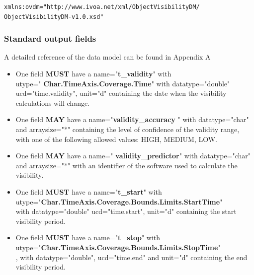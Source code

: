 \documentclass[11pt,a4paper]{ivoa}
\begin{document}
\begin{lstlisting}[language=XML]
xmlns:ovdm="http://www.ivoa.net/xml/ObjectVisibilityDM/
ObjectVisibilityDM-v1.0.xsd"
\end{lstlisting}

\subsubsection{Standard output fields}
A detailed reference of the data model can be found in Appendix A

\begin{itemize}
\item One field \textbf{MUST} have a name="\textbf{t\_validity}"
with\\ utype=" \textbf{Char.TimeAxis.Coverage.Time}" with
datatype="double" ucd="time.validity", unit="d" containing the date when
the visibility calculations will change.
\end{itemize}


\begin{itemize}
\item One field \textbf{MAY} have a name="\textbf{validity\_accuracy
}" with datatype="char" and arraysize="*" containing the level of
confidence of the validity range, with one of the following allowed
values: HIGH, MEDIUM, LOW.
\end{itemize}


\begin{itemize}
\item One field \textbf{MAY} have a name="\textbf{
validity\_predictor}" with datatype="char" and arraysize="*" with an
identifier of the software used to calculate the visibility.
\end{itemize}


\begin{itemize}
\item One field \textbf{MUST} have a name="\textbf{t\_start}" with\\
utype="\textbf{Char.TimeAxis.Coverage.Bounds.Limits.StartTime}"\\ with
datatype="double" ucd="time.start", unit="d" containing the start
visibility period.
\end{itemize}


\begin{itemize}
\item One field \textbf{MUST} have a name="\textbf{t\_stop}" with\\
utype="\textbf{Char.TimeAxis.Coverage.Bounds.Limits.StopTime}"\\, with
datatype="double", ucd="time.end" and unit="d" containing the end
visibility period.
\end{itemize}
\end{document}
